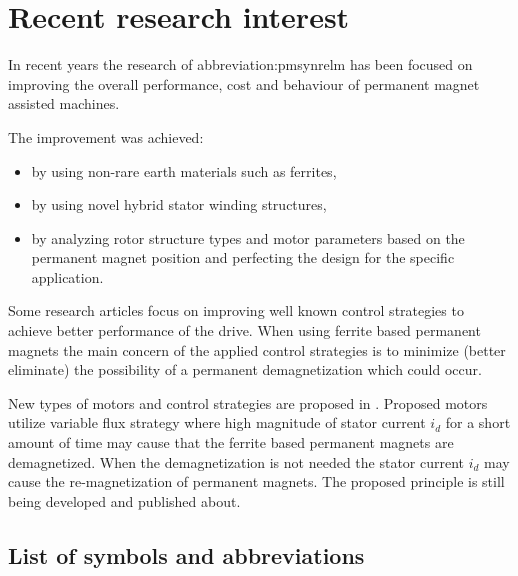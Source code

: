 \documentclass[a4paper, twoside, 11pt]{article}
\begin{document}
\newpage
\section{Recent research interest}
    In recent years the research of \gls{abbreviation:pmsynrelm} has been focused on improving the overall performance, cost and behaviour of permanent magnet assisted machines.\par
    The improvement was achieved:
        \begin{itemize}
        \item by using non-rare earth materials such as ferrites,
        \item by using novel hybrid stator winding structures,
        \item by analyzing rotor structure types and motor parameters based on the permanent magnet position and perfecting the design for the specific application.
        \end{itemize}

    Some research articles focus on improving well known control strategies to achieve better performance of the drive. When using ferrite based permanent magnets the main concern of the applied control strategies is to minimize (better eliminate) the possibility of a permanent demagnetization which could occur.\par
    New types of motors and control strategies are proposed in \cite{ostovic-Memory-motors-a-new-class-of-controllable-flux-PM-machines-for-a-true-wide-speed-operation}. Proposed motors utilize variable flux strategy where high magnitude of stator current $i_d$ for a short amount of time may cause that the ferrite based permanent magnets are demagnetized. When the demagnetization is not needed the stator current $i_d$ may cause the re-magnetization of permanent magnets. The proposed principle is still being developed and published about.


\flushbottom %


\newpage
\setmonofont{Times New Roman}

\printbibliography[title={{References}}]	
\nocite{*}
\setmonofont{CourierPrime-Regular}

\appendix
{}

\begin{appendices}
	\section{List of symbols and abbreviations}
    \vspace*{0.25cm}
		\printglossary[type=abbreviationslist, style = myStyleAbbreviations]

		\FloatBarrier
		\printglossary[type=symbolslist, style =  myStyleSymbols]

	\end{appendices}
\end{document}
